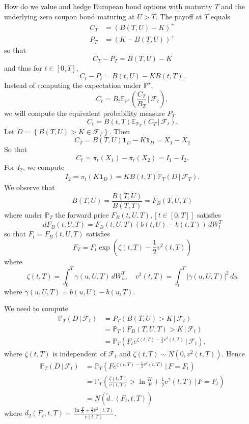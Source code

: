 \documentclass[10pt, oneside, reqno]{amsbook}
\theoremstyle{plain}%
\theoremstyle{definition}
\theoremstyle{remark}
\newcommand{\given}{ \, | \,}
\newcommand{\sigf}{\mathcal{F}}
\newcommand{\E}{\mathbb{E}}
\renewcommand{\P}{\mathbb{P}}
\numberwithin{equation}{chapter}
\begin{document}
    How do we value and hedge European bond options with maturity $T$ and the underlying zero coupon bond maturing at $U > T$.  The payoff at $T$ equals \begin{align*}
        C_T &= \left( B(T, U) - K \right)^+ \\
        P_T &= \left( K - B(T, U) \right)^+ 
    \end{align*} so that \[
        C_T - P_T = B(T, U) - K
    \] and thus for $t \in [0, T]$, \[
        C_t - P_t = B(t, U) - KB(t, T). 
    \]  Instead of computing the expectation under $\P^\star$, \[
        C_t = B_t \E_{\P^\star} \left( \frac{C_T}{B_T} \given \sigf_t \right),
    \] we will compute the equivalent probability measure $P_T$ \[
        C_t = B(t, T) \E_{\P_T} \left( C_T \given \sigf_t \right).
    \]  Let $D = \left\{ B(T, U) > K \in \sigf_T \right\}$.  Then \[
        C_T = B(T, U) \mathbf{1}_D - K \mathbf{1}_D = X_1 - X_2
    \] So that \[
        C_t = \pi_t(X_1) - \pi_t(X_2) = I_1 - I_2.
    \]  For $I_2$, we compute \begin{align*}
        I_2 = \pi_t(K \mathbf{1}_D) = K B(t, T) \P_T\left(D \given \sigf_T \right).  
    \end{align*} We observe that \[
        B(T, U) = \frac{B(T, U)}{B(T, T)} = F_B(T, U , T)
    \] where under $\P_T$ the forward price $F_B(t, U, T), [t \in [0, T]]$ satisfies \[
        dF_B(t, U , T) = F_B(t, U, T) \left( b(t, U) - b(t, T) \right) \, dW^T_t
    \] so that $F_t = F_B(t, U, T)$ satisfies \[
        F_T = F_t \exp \left( \zeta(t, T) - \frac{1}{2} v^2( t, T) \right)
    \] where \[
        \zeta(t, T) = \int_0^T \gamma(u, U , T) \, dW^T_u, \quad v^2(t, T) = \int_t^T \left| \gamma(u, U, T) \right|^2 \, du
    \] where $\gamma(u, U, T) = b(u, U) - b(u, T)$.    
    
    We need to compute \begin{align*}
        \P_T(D \given \sigf_t) &= P_T(B(T, U) > K  \given \sigf_t) \\
                        &= \P_T ( F_B(T, U, T) > K \given \sigf_t) \\
                        &= \P_T \left(F_t e^{\zeta(t, T) - \frac{1}{2} v^2(t, T)} \given \sigf_t \right),
    \end{align*} where $\zeta(t, T)$ is independent of $\sigf_t$ and $\zeta(t, T) \sim N(0, v^2(t, T))$.  Hence \begin{align*}
        \P_T(D \given \sigf_t) &= \P_T \left( F e^{\zeta(t, T) - \frac{1}{2} v^2(t, T)} \given F = F_t \right)  \\
        &= \P_T \left( \frac{\zeta(t, T)}{v(t, T)} > \ln \frac{K}{F} + \frac{1}{2} v^2(t, T) \given F = F_t \right) \\
        &= N( \tilde d_{-}(F_t, t, T))
    \end{align*} where $\tilde d_2(F_t, t, T) = \frac{\ln \frac{F}{K} \pm \frac{1}{2} v^2(t, T)}{v(t, T)}$.  
    
\end{document}
